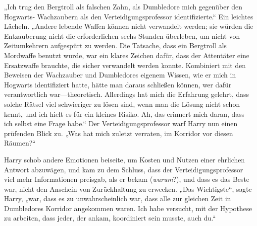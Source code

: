 „Ich trug den Bergtroll als falschen Zahn, als Dumbledore mich gegenüber den Hogwarts- Wachzaubern als den Verteidigungsprofessor identifizierte.“
Ein leichtes Lächeln.
„Andere lebende Waffen können nicht verwandelt werden; sie würden die Entzauberung nicht die erforderlichen sechs Stunden überleben, um nicht von Zeitumkehrern aufgespürt zu werden. Die Tatsache, dass ein Bergtroll als Mordwaffe benutzt wurde, war ein klares Zeichen dafür, dass der Attentäter eine Ersatzwaffe brauchte, die sicher verwandelt werden konnte. Kombiniert mit den Beweisen der Wachzauber und Dumbledores eigenem Wissen, wie er mich in Hogwarts identifiziert hatte, hätte man daraus schließen können, wer dafür verantwortlich war—theoretisch. Allerdings hat mich die Erfahrung gelehrt, dass solche Rätsel viel schwieriger zu lösen sind, wenn man die Lösung nicht schon kennt, und ich hielt es für ein kleines Risiko. Ah, das erinnert mich daran, dass ich selbst eine Frage habe.“
Der Verteidigungsprofessor warf Harry nun einen prüfenden Blick zu.
„Was hat mich zuletzt verraten, im Korridor vor diesen Räumen?“

Harry schob andere Emotionen beiseite, um Kosten und Nutzen einer ehrlichen Antwort abzuwägen, und kam zu dem Schluss, dass der Verteidigungsprofessor viel mehr Informationen preisgab, als er bekam (\emph{warum}?), und dass es das Beste war, nicht den Anschein von Zurückhaltung zu erwecken.
„Das Wichtigste“, sagte Harry, „war, dass es zu unwahrscheinlich war, dass alle zur gleichen Zeit in Dumbledores Korridor angekommen waren. Ich habe versucht, mit der Hypothese zu arbeiten, dass jeder, der ankam, koordiniert sein musste, auch du.“

